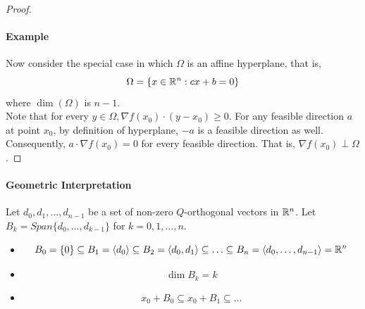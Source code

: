 \documentclass[11pt]{article}
\begin{document}
\begin{proof}
\paragraph{Example} Now consider the special case in which $\Omega$ is an affine hyperplane, that is, 
$$\Omega = \{ x \in \mathbb{R}^n: cx + b = 0\}$$
where $\dim(\Omega)$ is $n-1$. \\
Note that for every $y \in \Omega, \nabla f(x_0)\cdot (y - x_0) \geq 0$. For any feasible direction $a$ at point $x_0$, by definition of hyperplane, $-a$ is a feasible direction as well. \\
Consequently, $a \cdot \nabla f(x_0) = 0$ for every feasible direction. That is, $\nabla f(x_0) \perp \Omega$.
\end{proof}

\paragraph{Geometric Interpretation}
Let $d_0, d_1, \hdots, d_{n-1}$ be a set of non-zero $Q$-orthogonal vectors in $\mathbb{R}^n$. Let $B_k = Span \{d_0, \hdots, d_{k-1}\}$ for $k = 0, 1, \hdots, n$. \\
\begin{itemize}
	\item $$B_0 = \{0\} \subseteq B_1 = \langle d_0 \rangle \subseteq B_2 = \langle d_0, d_1 \rangle \subseteq \hdots \subseteq B_n = \langle d_0, \hdots, d_{n-1} \rangle  = \mathbb{R}^n$$
	\item $$\dim B_k = k$$ 
	\item $$x_0 + B_0 \subseteq x_0 + B_1 \subseteq \hdots$$
\end{itemize}
\end{document}
